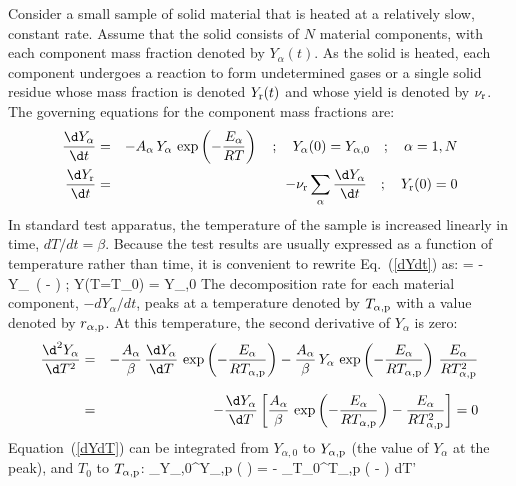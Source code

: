 \documentclass[11pt]{book}
\begin{document}
Consider a small sample of solid material that is heated at a relatively slow, constant rate. Assume that the solid consists of $N$ material components, with each component mass fraction denoted by $Y_\alpha(t)$. As the solid is heated, each component undergoes a reaction to form undetermined gases or a single solid residue whose mass fraction is denoted $Y_{\rm r}(t)$ and whose yield is denoted by $\nu_{\rm r}$. The governing equations for the component mass fractions are:
\begin{eqnarray}
   \frac{\d Y_\alpha}{\d t} &=& -A_\alpha \, Y_\alpha \, \exp \left( -\frac{E_\alpha}{RT} \right)    \quad ; \quad Y_\alpha(0) = Y_{\alpha,0} \quad ; \quad \alpha=1,N  \label{dYdt} \\
   \frac{\d Y_{\rm r}}{\d t} &=& -\nu_{\rm r}  \sum_\alpha \frac{\d Y_\alpha}{\d t}                                   \quad ; \quad Y_{\rm r}(0) = 0  \label{dYrdt}
\end{eqnarray}
In standard test apparatus, the temperature of the sample is increased linearly in time, $dT/dt=\beta$. Because the test results are usually expressed as a function of temperature rather than time, it is convenient to rewrite Eq.~(\ref{dYdt}) as:
\be
    = - \, Y_\alpha \, \exp \left( - \right)    \quad ; \quad Y(T=T_0) = Y_{\alpha,0}  \label{dYdT}
\ee
The decomposition rate for each material component, $-dY_\alpha/dt$, peaks at a temperature denoted by $T_{\alpha,{\rm p}}$ with a value denoted by $r_{\alpha,{\rm p}}$. At this temperature, the second derivative of $Y_\alpha$ is zero:
\begin{eqnarray}
   \frac{\d^2 Y_\alpha}{\d T^2} &=& -\frac{A_\alpha}{\beta} \, \frac{\d Y_\alpha}{\d T} \, \exp \left( -\frac{E_\alpha}{R T_{\alpha,{\rm p}} } \right) -
   \frac{A_\alpha}{\beta} \, Y_\alpha \, \exp \left( -\frac{E_\alpha}{R T_{\alpha,{\rm p}} } \right) \, \frac{E_\alpha}{R T_{\alpha,{\rm p}}^2} \nonumber \\[.1in]
   &=& -\frac{\d Y_\alpha}{\d T} \left[ \frac{A_\alpha}{\beta} \, \exp \left( -\frac{E_\alpha}{R T_{\alpha,{\rm p}} } \right) - \frac{E_\alpha}{R T_{\alpha,{\rm p}}^2} \right] = 0  \label{d2YdT2}
\end{eqnarray}
Equation~(\ref{dYdT}) can be integrated from $Y_{\alpha,0}$ to $Y_{\alpha,{\rm p}}$ (the value of $Y_\alpha$ at the peak), and $T_0$ to $T_{\alpha,{\rm p}}$:
\be
   \int_{Y_{\alpha,0}}^{Y_{\alpha,{\rm p}}} \left(  \right) = -  \int_{T_0}^{T_{\alpha,{\rm p}}} \exp \left( - \right) \; dT'
\end{document}

